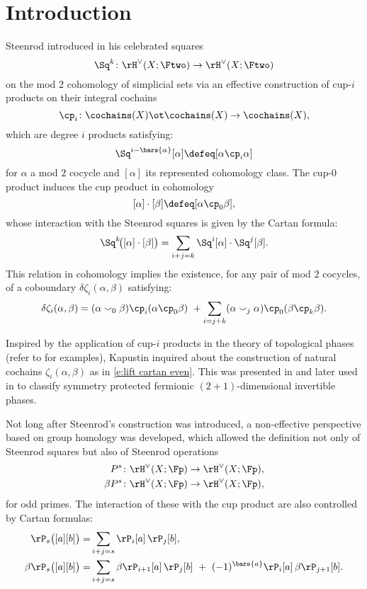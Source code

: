 
\section{Introduction} \label{s:introduction}

Steenrod introduced in \cite{steenrod1947products} his celebrated squares
\[
\Sq^k \colon \rH^\vee(X; \Ftwo) \to \rH^\vee(X; \Ftwo)
\]
on the mod 2 cohomology of simplicial sets via an effective construction of cup-$i$ products on their integral cochains
\[
\cp_i \colon \cochains(X) \ot \cochains(X) \to \cochains(X),
\]
which are degree $i$ products satisfying:
\[
\Sq^{i-\bars{\alpha}}[\alpha] \defeq [\alpha \cp_i \alpha]
\]
for $\alpha$ a mod $2$ cocycle and $[\alpha]$ its represented cohomology class.
The cup-$0$ product induces the cup product in cohomology
\[
[\alpha] \cdot [\beta] \defeq [\alpha \cp_0 \beta],
\]
whose interaction with the Steenrod squares is given by the Cartan formula:
\[
\Sq^k\!\big([\alpha] \cdot [\beta]\big) = \sum_{i+j=k} \Sq^i [\alpha] \cdot \Sq^j[\beta].
\]
This relation in cohomology implies the existence, for any pair of mod $2$ cocycles, of a coboundary $\delta\zeta_i(\alpha,\beta)$ satisfying:
\begin{equation}\label{e:lift cartan even}
	\delta\zeta_i(\alpha, \beta) =
	(\alpha \smallsmile_0 \beta) \cp_i (\alpha \cp_0 \beta) \ +
	\sum_{i=j+k} (\alpha \smallsmile_j \alpha) \cp_0 (\beta \cp_k \beta).
\end{equation}

Inspired by the application of cup-$i$ products in the theory of topological phases (refer to \cite{kapustin2015cobordism, gaiotto2016spin, kapustin2017fermionic} for examples), Kapustin inquired about the construction of natural cochains $\zeta_i(\alpha, \beta)$ as in \eqref{e:lift cartan even}.
This was presented in \cite{medina2020cartan} and later used in \cite{barkeshli2021classification} to classify symmetry protected fermionic $(2+1)$-dimensional invertible phases.

Not long after Steenrod's construction was introduced, a non-effective perspective based on group homology was developed, which allowed the definition not only of Steenrod squares but also of Steenrod operations
\begin{align*}
	P^s \colon& \rH^\vee(X; \Fp) \to \rH^\vee(X; \Fp), \\
	\beta P^s \colon& \rH^\vee(X; \Fp) \to \rH^\vee(X; \Fp),
\end{align*}
for odd primes.
The interaction of these with the cup product are also controlled by Cartan formulas:
\begin{align*}
	\rP_s\big([a][b]\big) =&
	\sum_{i+j=s} \rP_i[a] \, \rP_j[b], \\
	\beta\rP_s\big([a][b]\big) =&
	\sum_{i+j=s} \beta\rP_{i+1}[a] \, \rP_j[b] \ +\ (-1)^{\bars{a}} \rP_i[a] \, \beta\rP_{j+1}[b].
\end{align*}

